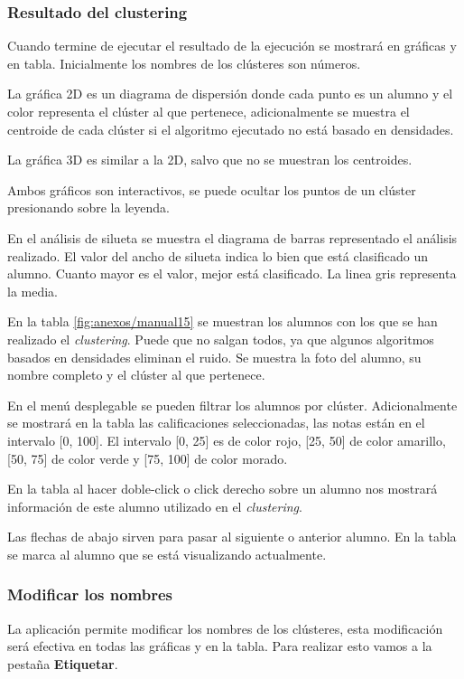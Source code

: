 \subsubsection{Resultado del clustering}
Cuando termine de ejecutar el resultado de la ejecución se mostrará en gráficas y en tabla. Inicialmente los nombres de los clústeres son números.

La gráfica 2D es un diagrama de dispersión donde cada punto es un alumno y el color representa el clúster al que pertenece, adicionalmente se muestra el centroide de cada clúster si el algoritmo ejecutado no está basado en densidades.

La gráfica 3D es similar a la 2D, salvo que no se muestran los centroides.

Ambos gráficos son interactivos, se puede ocultar los puntos de un clúster presionando sobre la leyenda.

En el análisis de silueta se muestra el diagrama de barras representado el análisis realizado. El valor del ancho de silueta indica lo bien que está clasificado un alumno. Cuanto mayor es el valor, mejor está clasificado. La linea gris representa la media.

En la tabla \ref{fig:anexos/manual15} se muestran los alumnos con los que se han realizado el \emph{clustering}. Puede que no salgan todos, ya que algunos algoritmos basados en densidades eliminan el ruido. Se muestra la foto del alumno, su nombre completo y el clúster al que pertenece.

En el menú desplegable se pueden filtrar los alumnos por clúster. Adicionalmente se mostrará en la tabla las calificaciones seleccionadas, las notas están en el intervalo [0, 100]. El intervalo [0, 25] es de color rojo, [25, 50] de color amarillo, [50, 75] de color verde y [75, 100] de color morado.

En la tabla al hacer doble-click o click derecho sobre un alumno nos mostrará información de este alumno utilizado en el \emph{clustering}.

Las flechas de abajo sirven para pasar al siguiente o anterior alumno. En la tabla se marca al alumno que se está visualizando actualmente.

\subsubsection{Modificar los nombres}
La aplicación permite modificar los nombres de los clústeres, esta modificación será efectiva en todas las gráficas y en la tabla. Para realizar esto vamos a la pestaña \textbf{Etiquetar}.

